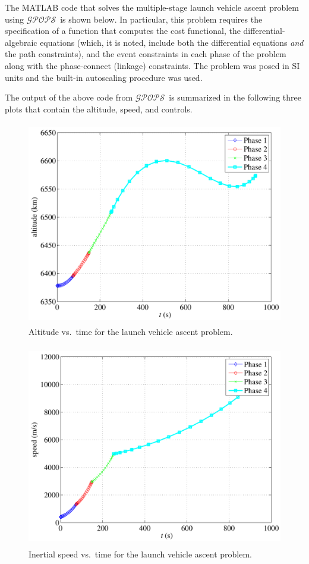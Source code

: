 \documentclass[10pt,final]{report}
\newcommand{\gpops}{$\mathcal{GPOPS}$~}
\newcounter{example}[chapter]
\newenvironment{shadedframe}{%
  \def\FrameCommand{\fcolorbox{black}{shadecolor}}%
  \MakeFramed {\FrameRestore}}
{\endMakeFramed}
\begin{document}
The MATLAB code that solves the multiple-stage launch vehicle ascent
problem using \gpops is shown below.  In particular, this
problem requires the specification of a function that computes the
cost functional, the differential-algebraic equations (which, it is
noted, include both the differential equations {\em and} the path
constraints), and the event constraints in each phase of the problem
along with the phase-connect (\ie linkage) constraints.  The problem
was posed in SI units and the built-in autoscaling procedure was
used.
\footnotesize
\begin{shadedframe}






\end{shadedframe}
\normalsize
The output of the above code from \gpops is summarized in the following three
plots that contain the altitude, speed, and controls.
\begin{figure}[H]
  \centering
  \includegraphics[height=3.5in]{altitudevstLaunch.pdf}
  \caption{Altitude vs.~time for the launch vehicle ascent problem.}
\end{figure}
\begin{figure}[H]
  \centering
  \includegraphics[height=3.5in]{speedvstLaunch.pdf}
  \caption{Inertial speed vs.~time for the launch vehicle ascent problem.}
\end{figure}
\end{document}
